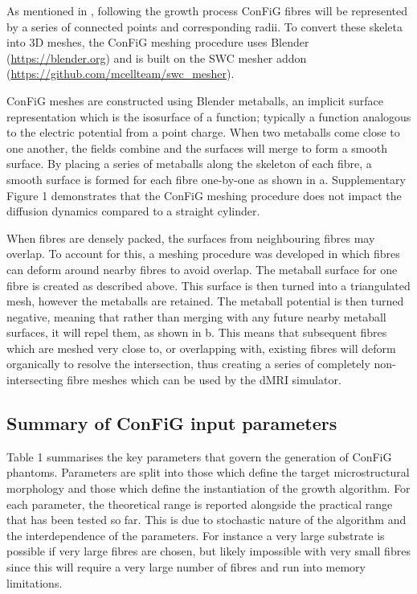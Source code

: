As mentioned in , following the growth process ConFiG fibres will be represented by a series of connected points and corresponding radii. To convert these skeleta into 3D meshes, the ConFiG meshing procedure uses Blender (\url{https://blender.org}) and is built on the SWC mesher addon (\url{https://github.com/mcellteam/swc_mesher}).

ConFiG meshes are constructed using Blender metaballs, an implicit surface representation which is the isosurface of a function; typically a function analogous to the electric potential from a point charge. When two metaballs come close to one another, the fields combine and the surfaces will merge to form a smooth surface. By placing a series of metaballs along the skeleton of each fibre, a smooth surface is formed for each fibre one-by-one as shown in a. Supplementary Figure 1 demonstrates that the ConFiG meshing procedure does not impact the diffusion dynamics compared to a straight cylinder.

When fibres are densely packed, the surfaces from neighbouring fibres may overlap. To account for this, a meshing procedure was developed in which fibres can deform around nearby fibres to avoid overlap. The metaball surface for one fibre is created as described above. This surface is then turned into a triangulated mesh, however the metaballs are retained. The metaball potential is then turned negative, meaning that rather than merging with any future nearby metaball surfaces, it will repel them, as shown in b. This means that subsequent fibres which are meshed very close to, or overlapping with, existing fibres will deform organically to resolve the intersection, thus creating a series of completely non-intersecting fibre meshes which can be used by the dMRI simulator.

\subsection{Summary of ConFiG input parameters}
\label{sec:config_summary_of_input}
Table 1 summarises the key parameters that govern the generation of ConFiG phantoms. Parameters are split into those which define the target microstructural morphology and those which define the instantiation of the growth algorithm. For each parameter, the theoretical range is reported alongside the practical range that has been tested so far. This is due to stochastic nature of the algorithm and the interdependence of the parameters. For instance a very large substrate is possible if very large fibres are chosen, but likely impossible with very small fibres since this will require a very large number of fibres and run into memory limitations.

